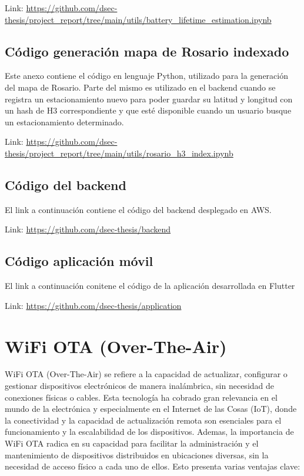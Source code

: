 \begin{appendixd}
            Link: \url{https://github.com/dsec-thesis/project_report/tree/main/utils/battery_lifetime_estimation.ipynb}


        \subsection{Código generación mapa de Rosario indexado}
            Este anexo contiene el código en lenguaje Python, utilizado para la generación del mapa de Rosario. 
            Parte del mismo es utilizado en el backend cuando se registra un estacionamiento nuevo para poder guardar su latitud y 
            longitud con un hash de H3 correspondiente y que esté disponible cuando un usuario busque un estacionamiento determinado.

            Link: \url{https://github.com/dsec-thesis/project_report/tree/main/utils/rosario_h3_index.ipynb}

        \subsection{Código del backend}
            El link a continuación contiene el código del backend desplegado en AWS.

            Link: \url{https://github.com/dsec-thesis/backend}

        \subsection{Código aplicación móvil}
            El link a continuación conitene el código de la aplicación desarrollada en Flutter

            Link: \url{https://github.com/dsec-thesis/application}
    \clearpage
    \section{WiFi OTA (Over-The-Air)}{\label{configuracion_wifi}}
        WiFi OTA (Over-The-Air) se refiere a la capacidad de actualizar, configurar o gestionar dispositivos electrónicos de manera inalámbrica, 
        sin necesidad de conexiones físicas o cables. Esta tecnología ha cobrado gran relevancia en el mundo de la electrónica y 
        especialmente en el Internet de las Cosas (IoT), donde la conectividad y la capacidad de actualización remota son 
        esenciales para el funcionamiento y la escalabilidad de los dispositivos. Ademas, la importancia de WiFi OTA radica 
        en su capacidad para facilitar la administración y el mantenimiento de dispositivos distribuidos en ubicaciones diversas,
        sin la necesidad de acceso físico a cada uno de ellos. Esto presenta varias ventajas clave:


\end{appendixd}
